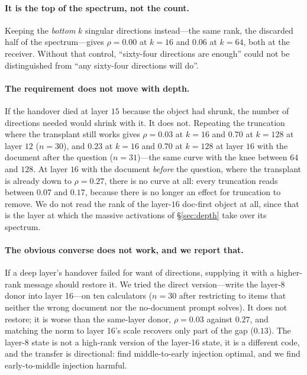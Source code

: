 \documentclass{article}
\begin{document}
\paragraph{It is the top of the spectrum, not the count.} Keeping the
\emph{bottom} $k$ singular directions instead---the same rank, the discarded
half of the spectrum---gives $\rho = 0.00$ at $k=16$ and $0.06$ at $k=64$, both
at the receiver. Without that control, ``sixty-four directions are enough''
could not be distinguished from ``any sixty-four directions will do''.

\paragraph{The requirement does not move with depth.} If the handover died at
layer $15$ because the object had shrunk, the number of directions needed would
shrink with it. It does not. Repeating the truncation where the transplant still
works gives $\rho = 0.03$ at $k=16$ and $0.70$ at $k=128$ at layer $12$
($n=30$), and $0.23$ at $k=16$ and $0.70$ at $k=128$ at layer $16$ with the
document after the question ($n=31$)---the same curve with the knee between $64$
and $128$. At layer $16$ with the document \emph{before} the question, where the
transplant is already down to $\rho=0.27$, there is no curve at all: every
truncation reads between $0.07$ and $0.17$, because there is no longer an effect
for truncation to remove. We do not read the rank of the layer-$16$
doc-first object at all, since that is the layer at which the massive
activations of \S\ref{sec:depth} take over its spectrum.



\paragraph{The obvious converse does not work, and we report that.} If a deep
layer's handover failed for want of directions, supplying it with a higher-rank
message should restore it. We tried the direct version---write the layer-8
donor into layer 16---on ten calculators ($n=30$ after restricting to items that
neither the wrong document nor the no-document prompt solves). It does not
restore; it is worse than the same-layer donor, $\rho = 0.03$ against $0.27$,
and matching the norm to layer 16's scale recovers only part of the gap
($0.13$). The layer-8 state is not a high-rank version of the layer-16 state, it
is a different code, and the transfer is directional:
\citet{ardoin2026promptcompression} find middle-to-early injection optimal, and
we find early-to-middle injection harmful.
\end{document}

